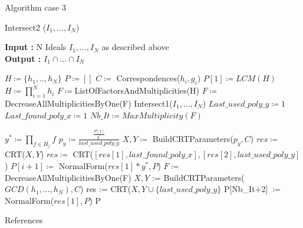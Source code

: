 \documentclass{beamer}
\begin{document}
\begin{frame}{Algorithm case 3}
    \begin{algorithm}[H]    \tiny
    \caption{Intersect2 ($I_{1},\dots,I_{N}$)}\label{alg:intersect-2-ideals-diff-gcd}
    \textbf{Input : } N Ideals $I_{1},\dots,I_{N}$ as described above \\
    \textbf{Output : }$I_{1} \cap \dots\cap I_ {N}$
\begin{algorithmic}
    \State $H \coloneqq \{h_{1},..,h_{N}\}$
    \State $P \coloneqq []$
    \State $C \coloneqq $ Correspondences($h_{i},g_{i}$) 
    \State $P[1] \coloneqq LCM(H)$
    \State $H \coloneqq \prod^{N}_{i=1} h_{i}$
    \State $F \coloneqq $ListOfFactorsAndMultiplicities(H)
    \State $F \coloneqq $DecreaseAllMultiplicitiesByOne(F)
        \State \Return Intersect1($I_{1},\dots,I_{N}$)
    \EndIf
    \State $Last\_used\_poly\_y \coloneqq 1$
    \State $Last\_found\_poly\_x \coloneqq 1$
    \State $Nb\_It \coloneqq MaxMultiplicity(F) $ 

        \State $y^{*}\coloneqq \prod_{f \in H_{j}} f$ 
        \State $p_y\coloneqq \frac{\frac{P[1]}{y^{*}}}{last\_used\_poly\_y}$ 
        \State $X, Y\coloneqq$ BuildCRTParameters($p_y, C$)
        \State $res \coloneqq $ CRT($X,Y$)
            \State $res \coloneqq $ CRT($[res[1],last\_found\_poly\_x],[res[2],last\_used\_poly\_y]$)
        \EndIf
        \State $P[i+1] \coloneqq $ NormalForm($res[1]*y^{*},P$)
        \State $F \coloneqq $ DecreaseAllMultiplicitiesByOne(F)
    \EndFor
    \State $X,Y$ := BuildCRTParameters($GCD(h_{1},\dots,h_{N}),C$)
    \State res := CRT($X,Y\cup\{last\_used\_poly\_y\}$
    \State P[Nb\_It+2] $\coloneqq $NormalForm($res[1],P$)
    \State \Return P

\end{algorithmic}
\end{algorithm}

\end{frame}


\begin{frame}{References}
    \nocite{*}
    \printbibliography
\end{frame}
\end{document}
